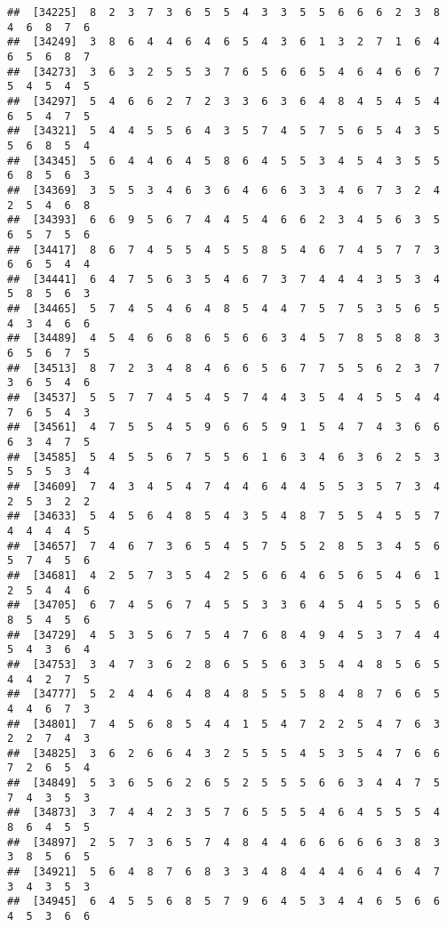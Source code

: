 \documentclass[
]{book}
\begin{document}
\begin{verbatim}
##  [34225]  8  2  3  7  3  6  5  5  4  3  3  5  5  6  6  6  2  3  8  4  6  8  7  6
##  [34249]  3  8  6  4  4  6  4  6  5  4  3  6  1  3  2  7  1  6  4  6  5  6  8  7
##  [34273]  3  6  3  2  5  5  3  7  6  5  6  6  5  4  6  4  6  6  7  5  4  5  4  5
##  [34297]  5  4  6  6  2  7  2  3  3  6  3  6  4  8  4  5  4  5  4  6  5  4  7  5
##  [34321]  5  4  4  5  5  6  4  3  5  7  4  5  7  5  6  5  4  3  5  5  6  8  5  4
##  [34345]  5  6  4  4  6  4  5  8  6  4  5  5  3  4  5  4  3  5  5  6  8  5  6  3
##  [34369]  3  5  5  3  4  6  3  6  4  6  6  3  3  4  6  7  3  2  4  2  5  4  6  8
##  [34393]  6  6  9  5  6  7  4  4  5  4  6  6  2  3  4  5  6  3  5  6  5  7  5  6
##  [34417]  8  6  7  4  5  5  4  5  5  8  5  4  6  7  4  5  7  7  3  6  6  5  4  4
##  [34441]  6  4  7  5  6  3  5  4  6  7  3  7  4  4  4  3  5  3  4  5  8  5  6  3
##  [34465]  5  7  4  5  4  6  4  8  5  4  4  7  5  7  5  3  5  6  5  4  3  4  6  6
##  [34489]  4  5  4  6  6  8  6  5  6  6  3  4  5  7  8  5  8  8  3  6  5  6  7  5
##  [34513]  8  7  2  3  4  8  4  6  6  5  6  7  7  5  5  6  2  3  7  3  6  5  4  6
##  [34537]  5  5  7  7  4  5  4  5  7  4  4  3  5  4  4  5  5  4  4  7  6  5  4  3
##  [34561]  4  7  5  5  4  5  9  6  6  5  9  1  5  4  7  4  3  6  6  6  3  4  7  5
##  [34585]  5  4  5  5  6  7  5  5  6  1  6  3  4  6  3  6  2  5  3  5  5  5  3  4
##  [34609]  7  4  3  4  5  4  7  4  4  6  4  4  5  5  3  5  7  3  4  2  5  3  2  2
##  [34633]  5  4  5  6  4  8  5  4  3  5  4  8  7  5  5  4  5  5  7  4  4  4  4  5
##  [34657]  7  4  6  7  3  6  5  4  5  7  5  5  2  8  5  3  4  5  6  5  7  4  5  6
##  [34681]  4  2  5  7  3  5  4  2  5  6  6  4  6  5  6  5  4  6  1  2  5  4  4  6
##  [34705]  6  7  4  5  6  7  4  5  5  3  3  6  4  5  4  5  5  5  6  8  5  4  5  6
##  [34729]  4  5  3  5  6  7  5  4  7  6  8  4  9  4  5  3  7  4  4  5  4  3  6  4
##  [34753]  3  4  7  3  6  2  8  6  5  5  6  3  5  4  4  8  5  6  5  4  4  2  7  5
##  [34777]  5  2  4  4  6  4  8  4  8  5  5  5  8  4  8  7  6  6  5  4  4  6  7  3
##  [34801]  7  4  5  6  8  5  4  4  1  5  4  7  2  2  5  4  7  6  3  2  2  7  4  3
##  [34825]  3  6  2  6  6  4  3  2  5  5  5  4  5  3  5  4  7  6  6  7  2  6  5  4
##  [34849]  5  3  6  5  6  2  6  5  2  5  5  5  6  6  3  4  4  7  5  7  4  3  5  3
##  [34873]  3  7  4  4  2  3  5  7  6  5  5  5  4  6  4  5  5  5  4  8  6  4  5  5
##  [34897]  2  5  7  3  6  5  7  4  8  4  4  6  6  6  6  6  3  8  3  3  8  5  6  5
##  [34921]  5  6  4  8  7  6  8  3  3  4  8  4  4  4  6  4  6  4  7  3  4  3  5  3
##  [34945]  6  4  5  5  6  8  5  7  9  6  4  5  3  4  4  6  5  6  6  4  5  3  6  6

\end{verbatim}
\end{document}
